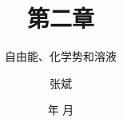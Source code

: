 \documentclass[dvipsnames, svgnames, x11names]{beamer}
\title{第二章}
\subtitle{自由能、化学势和溶液}
\author{张斌}
\institute[理工系]{河北农业大学 理工系}
\date{\the\year 年 \the\month 月}
\begin{document}
	\begin{frame}
		\titlepage
		\thispagestyle{empty}
		\addtocounter{framenumber}{-1}
	\end{frame}

	\begin{frame}{}
        \begin{center}
            {\Huge {}}
        \end{center}
		\tableofcontents
		\thispagestyle{empty}
		\addtocounter{framenumber}{-1}
	\end{frame}











\end{document}
